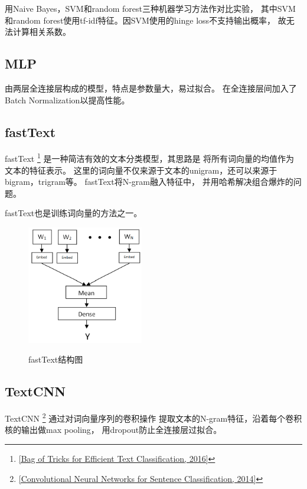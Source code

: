 \documentclass[12pt, UTF8, a4paper]{ctexart}
\begin{document}
用Naive Bayes，SVM和random forest三种机器学习方法作对比实验，
其中SVM和random forest使用tf-idf特征。因SVM使用的hinge loss不支持输出概率，
故无法计算相关系数。

\subsection{MLP}

由两层全连接层构成的模型，特点是参数量大，易过拟合。
在全连接层间加入了Batch Normalization以提高性能。

\subsection{fastText}

fastText
\footnote{\href{https://arxiv.org/pdf/1607.01759.pdf}
{[Bag of Tricks for Efficient Text Classification, 2016]}}
是一种简洁有效的文本分类模型，其思路是
将所有词向量的均值作为文本的特征表示。
这里的词向量不仅来源于文本的unigram，还可以来源于bigram，trigram等。
fastText将N-gram融入特征中，
并用哈希解决组合爆炸的问题。

fastText也是训练词向量的方法之一。

\begin{figure}[htb]
    \centering
    \includegraphics[width=2in, keepaspectratio]{./pic/fastText.png}\\
    \caption{fastText结构图}
\end{figure}

\subsection{TextCNN}

TextCNN
\footnote{\href{https://arxiv.org/abs/1408.5882}
{[Convolutional Neural Networks for Sentence Classification, 2014]}}
通过对词向量序列的卷积操作
提取文本的N-gram特征，沿着每个卷积核的输出做max pooling，
用dropout防止全连接层过拟合。
\end{document}
